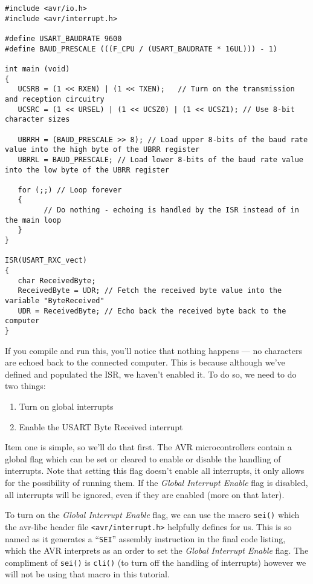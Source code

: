 \documentclass[a4paper,oneside,notitlepage]{book}
\begin{document}
\begin{center}
\begin{lstlisting}
#include <avr/io.h>
#include <avr/interrupt.h>

#define USART_BAUDRATE 9600
#define BAUD_PRESCALE (((F_CPU / (USART_BAUDRATE * 16UL))) - 1)

int main (void)
{
   UCSRB = (1 << RXEN) | (1 << TXEN);   // Turn on the transmission and reception circuitry
   UCSRC = (1 << URSEL) | (1 << UCSZ0) | (1 << UCSZ1); // Use 8-bit character sizes

   UBRRH = (BAUD_PRESCALE >> 8); // Load upper 8-bits of the baud rate value into the high byte of the UBRR register
   UBRRL = BAUD_PRESCALE; // Load lower 8-bits of the baud rate value into the low byte of the UBRR register

   for (;;) // Loop forever
   {
         // Do nothing - echoing is handled by the ISR instead of in the main loop
   }
}

ISR(USART_RXC_vect)
{
   char ReceivedByte;
   ReceivedByte = UDR; // Fetch the received byte value into the variable "ByteReceived"
   UDR = ReceivedByte; // Echo back the received byte back to the computer
}
\end{lstlisting}
\end{center}

If you compile and run this, you'll notice that nothing happens --- no characters are echoed back to the connected computer. This is because although we've defined and populated the ISR, we haven't enabled it. To do so, we need to do two things:

\begin{enumerate}
	\item Turn on global interrupts
    \item Enable the USART Byte Received interrupt
\end{enumerate}

Item one is simple, so we'll do that first. The AVR microcontrollers contain a global flag which can be set or cleared to enable or disable the handling of interrupts. Note that setting this flag doesn't enable all interrupts, it only allows for the possibility of running them. If the \emph{Global Interrupt Enable} flag is disabled, all interrupts will be ignored, even if they are enabled (more on that later).

To turn on the \emph{Global Interrupt Enable} flag, we can use the macro \texttt{sei()} which the avr-libc header file \texttt{<avr/interrupt.h>} helpfully defines for us. This is so named as it generates a ``\texttt{SEI}'' assembly instruction in the final code listing, which the AVR interprets as an order to set the \emph{Global Interrupt Enable} flag. The compliment of \texttt{sei()} is \texttt{cli()} (to turn off the handling of interrupts) however we will not be using that macro in this tutorial.
\end{document}
